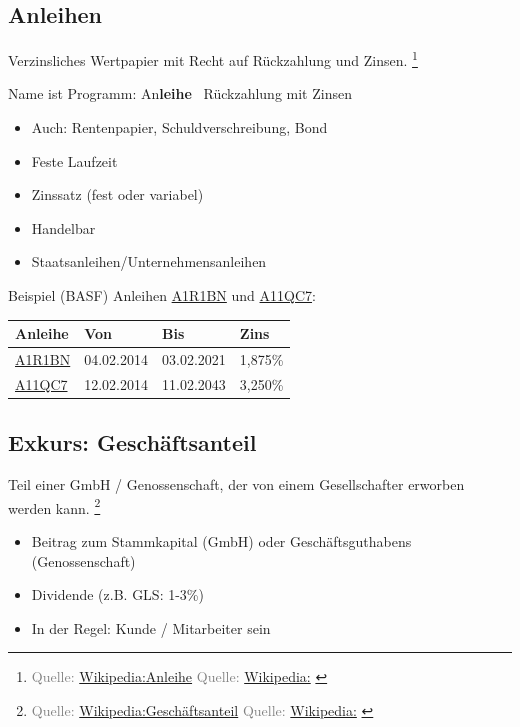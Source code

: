 \documentclass{beamer}
\let\oldfootnote\footnote
\renewcommand{\footnote}[1]
{%
	\oldfootnote
	{
		\tiny
		\textcolor{gray}{#1}
	}%
}
\newcommand{\citewiki}[2][]
{%
	\footnote
	{
		\ifthenelse{\isempty{#1}}
		{
			Quelle: \href{https://de.wikipedia.org/wiki/#2}{Wikipedia:#2}
		}
		{
			Quelle: \href{https://de.wikipedia.org/wiki/#2}{Wikipedia:#1}
		}
	}
}
\begin{document}
		\subsection{Anleihen}
		
			\begin{frame}
				\begin{definition}
					Verzinsliches Wertpapier mit Recht auf Rückzahlung und Zinsen.\citewiki{Anleihe}
				\end{definition}
				Name ist Programm: An\textbf{leihe} \textrightarrow\ Rückzahlung mit Zinsen
				\begin{itemize}
					\item Auch: Rentenpapier, Schuldverschreibung, Bond
					\item Feste Laufzeit
					\item Zinssatz (fest oder variabel)
					\item Handelbar
					\item Staatsanleihen/Unternehmensanleihen
				\end{itemize}
			\end{frame}
		
			\begin{frame}{Beispiel (BASF)}
				Anleihen \href{https://www.finanzen.net/anleihen/a1r1bn-basf-se-anleihe}{A1R1BN} und \href{https://www.finanzen.net/anleihen/a11qc7-basf-se-anleihe}{A11QC7}:
				\begin{center}
					\begin{tabularx}{8cm}{l|l|l|l}
						Anleihe	& Von			& Bis			& Zins		\\
						\hline
						\href{https://www.finanzen.net/anleihen/a1r1bn-basf-se-anleihe}{A1R1BN}	& 04.02.2014	& 03.02.2021	& 1,875\%	\\
						\href{https://www.finanzen.net/anleihen/a11qc7-basf-se-anleihe}{A11QC7}	& 12.02.2014	& 11.02.2043	& 3,250\%	\\
					\end{tabularx}
				\end{center}
			\end{frame}
		
		\subsection{Exkurs: Geschäftsanteil}
		
			\begin{frame}
				\begin{definition}
					Teil einer GmbH / Genossenschaft, der von einem Gesellschafter erworben werden kann.\citewiki{Geschäftsanteil}
				\end{definition}
			
				\begin{itemize}
					\item Beitrag zum Stammkapital (GmbH) oder Geschäftsguthabens (Genossenschaft)
					\item Dividende (z.B. GLS: 1-3\%)
					\item In der Regel: Kunde / Mitarbeiter sein
				\end{itemize}
			\end{frame}
		
\end{document}
